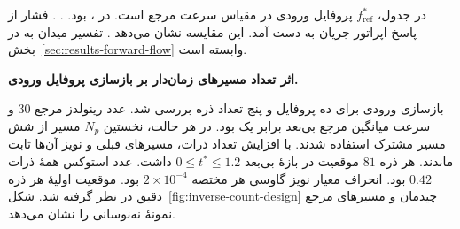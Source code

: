 در جدول، $f_{\mathrm{ref}}^*$ پروفایل ورودی در مقیاس سرعت مرجع است.
در ،   بود.
  .
  .
فشار از پاسخ اپراتور جریان به دست آمد.
این مقایسه نشان می‌دهد .
تفسیر میدان به  در بخش~\ref{sec:results-forward-flow} وابسته است.

\par\medskip
\noindent\textbf{اثر تعداد مسیرهای زمان‌دار بر بازسازی پروفایل ورودی.}\par\smallskip

بازسازی ورودی برای ده پروفایل و پنج تعداد ذره بررسی شد.
عدد رینولدز مرجع $30$ و سرعت میانگین مرجع بی‌بعد برابر یک بود.
در هر حالت، نخستین $N_p$ مسیر از شش مسیر مشترک استفاده شدند.
با افزایش تعداد ذرات، مسیرهای قبلی و نویز آن‌ها ثابت ماندند.
هر ذره $81$ موقعیت در بازهٔ بی‌بعد $0\leq t^*\leq1.2$ داشت.
عدد استوکس همهٔ ذرات $0.42$ بود.
انحراف معیار نویز گاوسی هر مختصه $2\times10^{-4}$ بود.
موقعیت اولیهٔ هر ذره دقیق در نظر گرفته شد.
شکل~\ref{fig:inverse-count-design} چیدمان و مسیرهای مرجع نمونهٔ نه‌نوسانی را نشان می‌دهد.

